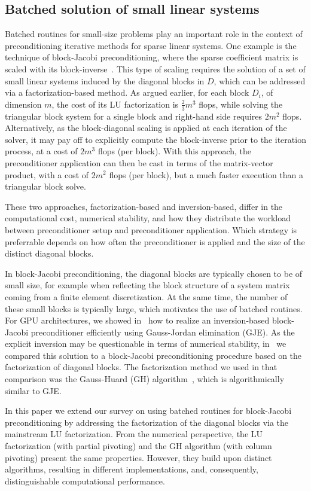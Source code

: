 \subsection{Batched solution of small linear systems}

Batched routines for small-size problems play an important role in the context of preconditioning 
iterative methods for sparse linear systems.
One example is the technique of block-Jacobi preconditioning, where the sparse
coefficient matrix is scaled with its block-inverse~\cite{saad}. 
This type of scaling requires the solution of a set of small linear systems 
induced by the diagonal blocks in $D$, which can be addressed via a factorization-based method.
As argued earlier, for each block $D_i$, of dimension $m$, the cost of its LU factorization is $\frac{2}{3}m^3$ flops,
while solving the triangular block system for a single block and right-hand side requires $2m^2$ flops.
Alternatively, as the block-diagonal scaling is applied at each
iteration of the solver, it may pay off to explicitly compute the block-inverse 
prior to the iteration process, 
at a cost of $2m^3$ flops (per block).
With this approach, the preconditioner application can then be cast in terms of the matrix-vector product,
with a cost of $2m^2$ flops (per block), but a much faster execution than a triangular block solve.

These two approaches, factorization-based
and inversion-based,
differ in the computational cost, numerical stability,
and how they distribute the workload between preconditioner setup and preconditioner application.
Which strategy is preferrable depends on how often the preconditioner is applied 
and the size of the distinct diagonal blocks.

In block-Jacobi preconditioning, the diagonal blocks are typically chosen to be of small size,
for example when reflecting the block structure of a system matrix coming from a finite element discretization.
At the same time, the number of these small blocks is typically large, which motivates the use of batched routines.
For GPU architectures, we showed in~\cite{gje}
how to realize an inversion-based block-Jacobi preconditioner efficiently using Gauss-Jordan elimination (GJE).
As the explicit inversion may be questionable in terms of numerical stability, 
in~\cite{gh} 
we compared this solution 
to a block-Jacobi preconditioning procedure based on the factorization of diagonal blocks.
The factorization method we used in that comparison was the Gauss-Huard (GH) algorithm~\cite{Hua79}, 
which is algorithmically similar to GJE.

In this paper we extend our survey on using batched routines for block-Jacobi preconditioning by
addressing the factorization of the diagonal blocks via the mainstream LU factorization.
From the numerical perspective, the LU factorization (with partial pivoting) and the GH algorithm (with column pivoting)
present the same properties. However, they build upon distinct algorithms, resulting in different implementations, 
and, consequently, distinguishable computational performance.


